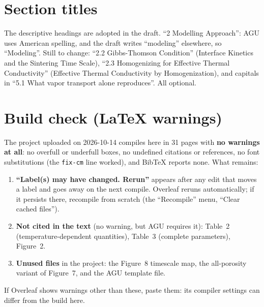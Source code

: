 \documentclass[11pt]{article}
\begin{document}
\section*{Section titles}
The descriptive headings are adopted in the draft. ``2 Modelling
Approach'': AGU uses American spelling, and the draft writes ``modeling''
elsewhere, so ``Modeling''. Still to change: ``2.2 Gibbs-Thomson Condition''
(Interface Kinetics and the Sintering Time Scale), ``2.3 Homogenizing for
Effective Thermal Conductivity'' (Effective Thermal Conductivity by
Homogenization), and capitals in ``5.1 What vapor transport alone
reproduces''. All optional.

\section*{Build check (LaTeX warnings)}

The project uploaded on 2026-10-14 compiles here in 31 pages with
\textbf{no warnings at all}: no overfull or underfull boxes, no undefined
citations or references, no font substitutions (the \verb|fix-cm| line
worked), and BibTeX reports none. What remains:
\begin{enumerate}
\item \textbf{``Label(s) may have changed. Rerun''} appears after any edit
  that moves a label and goes away on the next compile. Overleaf reruns
  automatically; if it persists there, recompile from scratch (the
  ``Recompile'' menu, ``Clear cached files'').
\item \textbf{Not cited in the text} (no warning, but AGU requires it):
  Table~2 (temperature-dependent quantities), Table~3 (complete
  parameters), Figure~2.
\item \textbf{Unused files} in the project: the Figure~8 timescale map,
  the all-porosity variant of Figure~7, and the AGU template file.
\end{enumerate}
If Overleaf shows warnings other than these, paste them: its compiler
settings can differ from the build here.
\end{document}
